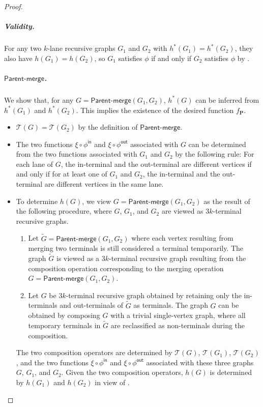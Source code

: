 \documentclass[11pt]{article}
\theoremstyle{definition}
\theoremstyle{remark}
\newcommand{\fin}{\phi^{\mathsf{in}}}
\newcommand{\fout}{\phi^{\mathsf{out}}}
\newcommand{\pmerge}{\mathsf{Parent}\text{-}\mathsf{merge}}
\newcommand{\fp}{f_{\mathbf{P}}}
\begin{document}
\begin{proof}
\subparagraph{Validity.}
For any two $k$-lane recursive graphs $G_1$ and $G_2$ with $h^\ast(G_1) = h^\ast(G_2)$, they also have $h(G_1) = h(G_2)$, so $G_1$ satisfies $\phi$ if and only if $G_2$ satisfies $\phi$ by .

\subparagraph{$\pmerge$.} We show that, for any $G = \pmerge(G_1, G_2)$,  $h^\ast(G)$ can be inferred from $h^\ast(G_1)$ and $h^\ast(G_2)$. This implies the existence of the desired function $\fp$.
\begin{itemize}
\item $\mathcal{T}(G) = \mathcal{T}(G_2)$ by the definition of $\pmerge$.
\item The two functions $\xi\circ \fin$ and $\xi\circ \fout$ associated with $G$ can be determined from the two functions associated with $G_1$ and $G_2$ by the following rule: For each lane of $G$, the in-terminal and the out-terminal are different vertices if and only if for at least one of $G_1$ and $G_2$, the in-terminal and the out-terminal are different vertices in the same lane.
    \item To determine $h(G)$, we view $G = \pmerge(G_1, G_2)$ as the result of the following procedure, where $G$, $G_1$, and $G_2$ are viewed as $3k$-terminal recursive graphs.
    \begin{enumerate}
        \item Let $\tilde{G} = \pmerge(G_1, G_2)$ where each vertex resulting from merging two terminals is still considered a terminal temporarily. The graph $\tilde{G}$ is viewed as a $3k$-terminal recursive graph resulting from the composition operation corresponding to the merging operation $G = \pmerge(G_1, G_2)$.
        \item Let $G$ be $3k$-terminal recursive graph obtained by retaining only the in-terminals and out-terminals of $\tilde{G}$ as terminals. The graph $G$ can be obtained by composing $G$ with a trivial single-vertex graph, where all temporary terminals in $\tilde{G}$ are reclassified as non-terminals during the composition.
    \end{enumerate}
        The two composition operators are determined by $\mathcal{T}(G)$, $\mathcal{T}(G_1)$, $\mathcal{T}(G_2)$, and the two functions $\xi\circ \fin$ and $\xi\circ \fout$ associated with these three graphs $G$, $G_1$, and $G_2$. 
    Given the two composition operators, $h(G)$ is determined by $h(G_1)$ and $h(G_2)$ in view of .
\end{itemize}


\end{proof}
\end{document}

